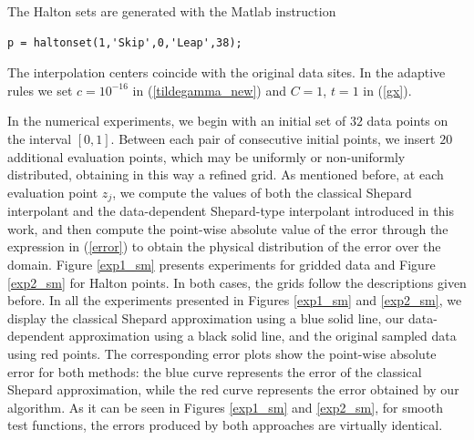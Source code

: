 \documentclass[preprint]{elsarticle}       %
\begin{document}
The Halton sets are generated with the Matlab instruction
\begin{lstlisting}	
p = haltonset(1,'Skip',0,'Leap',38);
\end{lstlisting}

The interpolation centers coincide with the original data sites. In the adaptive rules we set $c = 10^{-16}$ in (\ref{tildegamma_new}) and $C = 1$, $t = 1$ in (\ref{gx}). 

In the numerical experiments, we begin with an initial set of \(32\) data points on the interval \([0,1]\). Between each pair of consecutive initial points, we insert \(20\) additional evaluation points, which may be uniformly or non-uniformly distributed, obtaining in this way a refined grid. As mentioned before, at each evaluation point \(z_j\), we compute the values of both the classical Shepard interpolant and the data-dependent Shepard-type interpolant introduced in this work, and then compute the point-wise absolute value of the error through the expression in (\ref{error}) to obtain the physical distribution of the error over the domain.  Figure \ref{exp1_sm} presents experiments for gridded data and Figure \ref{exp2_sm} for Halton points. In both cases, the grids follow the descriptions given before. In all the experiments presented in Figures \ref{exp1_sm} and \ref{exp2_sm}, we display the classical Shepard approximation using a blue solid line, our data-dependent approximation using a black solid line, and the original sampled data using red points. The corresponding error plots show the point-wise absolute error for both methods: the blue curve represents the error of the classical Shepard approximation, while the red curve represents the error obtained by our algorithm. As it can be seen in Figures \ref{exp1_sm} and \ref{exp2_sm}, for smooth test functions, the errors produced by both approaches are virtually identical.
\end{document}
